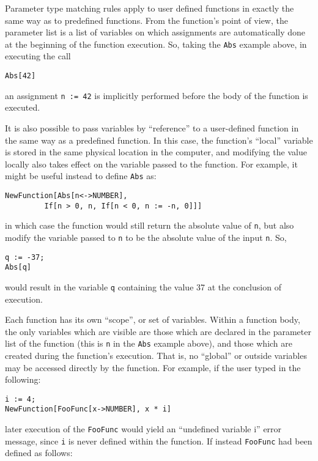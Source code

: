 Parameter type matching rules apply to user defined functions in
exactly the same way as to predefined functions.  From the function's
point of view, the parameter list is a list of variables on which
assignments are automatically done at the beginning of the function
execution.  So, taking the \verb+Abs+ example above, in executing the
call

\begin{verbatim}
Abs[42]
\end{verbatim}

\noindent an assignment \verb+n := 42+ is implicitly performed before
the body of the function is executed.

It is also possible to pass variables by ``reference'' to a
user-defined function in the same way as a predefined function.  In
this case, the function's ``local'' variable is stored in the same
physical location in the computer, and modifying the value locally
also takes effect on the variable passed to the function.  For
example, it might be useful instead to define \verb+Abs+ as:

\begin{verbatim}
NewFunction[Abs[n<->NUMBER],
		 If[n > 0, n, If[n < 0, n := -n, 0]]]
\end{verbatim}

\noindent in which case the function would still return the absolute
value of \verb+n+, but also modify the variable passed to \verb+n+ to
be the absolute value of the input \verb+n+.  So,

\begin{verbatim}
q := -37;
Abs[q]
\end{verbatim}

\noindent would result in the variable \verb+q+ containing the value
37 at the conclusion of execution.

Each function has its own ``scope'', or set of variables.  Within a
function body, the only variables which are visible are those which
are declared in the parameter list of the function (this is \verb+n+
in the \verb+Abs+ example above), and those which are created during
the function's execution.  That is, no ``global'' or outside variables
may be accessed directly by the function.  For example, if the user
typed in the following:

\begin{verbatim}
i := 4;
NewFunction[FooFunc[x->NUMBER], x * i]
\end{verbatim}

\noindent later execution of the \verb+FooFunc+ would yield an
``undefined variable i'' error message, since \verb+i+ is never
defined within the function.  If instead \verb+FooFunc+ had been
defined as follows:

